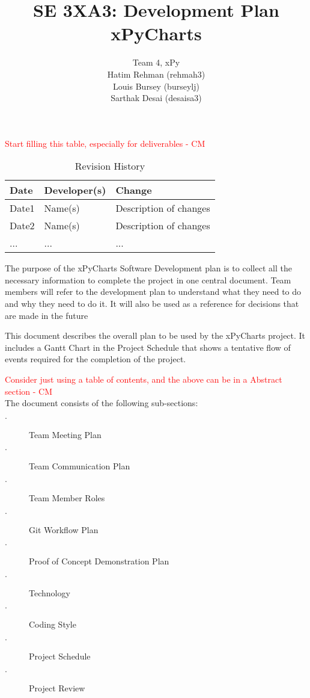 \documentclass{article}
\title{SE 3XA3: Development Plan\\xPyCharts}
\author{Team 4, xPy
		\\ Hatim Rehman (rehmah3)
		\\ Louis Bursey (burseylj)
		\\ Sarthak Desai (desaisa3)
}
\date{}
\begin{document}
\textcolor{red}{Start filling this table, especially for deliverables - CM} \\
\begin{table}[hp]
\caption{Revision History} \label{TblRevisionHistory}
\begin{tabularx}{\textwidth}{llX}
\toprule
\textbf{Date} & \textbf{Developer(s)} & \textbf{Change}\\
\midrule
Date1 & Name(s) & Description of changes\\
Date2 & Name(s) & Description of changes\\
... & ... & ...\\
\bottomrule
\end{tabularx}
\end{table}

\newpage

\maketitle

The purpose of the xPyCharts Software Development plan is to collect all the necessary information to complete the project in one central document. Team members will refer to the development plan to understand what they need to do and why they need to do it. It will also be used as a reference for decisions that are made in the future

This document describes the overall plan to be used by the xPyCharts project. It includes a Gantt Chart in the Project Schedule that shows a tentative flow of events required for the completion of the project.


\textcolor{red}{ Consider just using a table of contents, and the above can be in a Abstract section - CM} \\
The document consists of the following sub-sections:
\begin{description}
  \item[$\cdot$] Team Meeting Plan
  \item[$\cdot$] Team Communication Plan
  \item[$\cdot$] Team Member Roles
  \item[$\cdot$] Git Workflow Plan
  \item[$\cdot$] Proof of Concept Demonstration Plan
  \item[$\cdot$] Technology
  \item[$\cdot$] Coding Style
  \item[$\cdot$] Project Schedule
  \item[$\cdot$] Project Review
  
\end{description}
\end{document}
